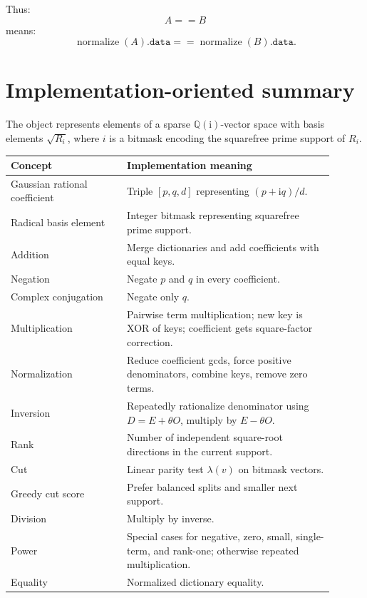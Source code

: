 \documentclass[11pt]{article}
\newcommand{\QQ}{\mathbb{Q}}
\newcommand{\ii}{\mathrm{i}}
\begin{document}
Thus:
\begin{equation}
  A==B
\end{equation}
means:
\begin{equation}
  \operatorname{normalize}(A).\texttt{data}
  ==
  \operatorname{normalize}(B).\texttt{data}.
\end{equation}

\section{Implementation-oriented summary}

The object represents elements of a sparse \(\QQ(\ii)\)-vector space with basis elements \(\sqrt{R_i}\), where \(i\) is a bitmask encoding the squarefree prime support of \(R_i\).

\begin{center}
\begin{tabular}{>{\raggedright\arraybackslash}p{0.32\linewidth} >{\raggedright\arraybackslash}p{0.58\linewidth}}
\toprule
Concept & Implementation meaning \\
\midrule
Gaussian rational coefficient & Triple \([p,q,d]\) representing \((p+\ii q)/d\). \\
Radical basis element & Integer bitmask representing squarefree prime support. \\
Addition & Merge dictionaries and add coefficients with equal keys. \\
Negation & Negate \(p\) and \(q\) in every coefficient. \\
Complex conjugation & Negate only \(q\). \\
Multiplication & Pairwise term multiplication; new key is XOR of keys; coefficient gets square-factor correction. \\
Normalization & Reduce coefficient gcds, force positive denominators, combine keys, remove zero terms. \\
Inversion & Repeatedly rationalize denominator using \(D=E+\theta O\), multiply by \(E-\theta O\). \\
Rank & Number of independent square-root directions in the current support. \\
Cut & Linear parity test \(\lambda(v)\) on bitmask vectors. \\
Greedy cut score & Prefer balanced splits and smaller next support. \\
Division & Multiply by inverse. \\
Power & Special cases for negative, zero, small, single-term, and rank-one; otherwise repeated multiplication. \\
Equality & Normalized dictionary equality. \\
\bottomrule
\end{tabular}
\end{center}
\end{document}
